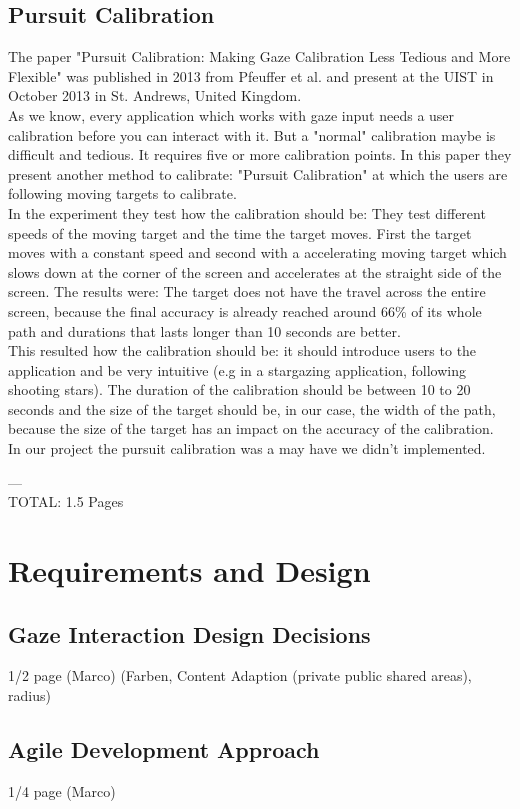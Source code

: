 \documentclass{sigchi}
\begin{document}
\subsection{Pursuit Calibration}
The paper "Pursuit Calibration: Making Gaze Calibration Less Tedious and More Flexible" was published in 2013 from Pfeuffer et al. and present at the UIST in October 2013 in St. Andrews, United Kingdom.\\
As we know, every application which works with gaze input needs a user calibration before you can interact with it. But a "normal" calibration maybe is difficult and tedious. It requires five or more calibration points. In this paper they present another method to calibrate: "Pursuit Calibration" at which the users are following moving targets to calibrate.\\
In the experiment they test how the calibration should be: They test different speeds of the moving target and the time the target moves. First the target moves with a constant speed and second with a accelerating moving target which slows down at the corner of the screen and accelerates at the straight side of the screen. The results were: The target does not have the travel across the entire screen, because the final accuracy is already reached around 66\% of its whole path and durations that lasts longer than 10 seconds are better.\\
This resulted how the calibration should be: it should introduce users to the application and be very intuitive (e.g in a stargazing application, following shooting stars). The duration of the calibration should be between 10 to 20 seconds and the size of the target should be, in our case, the width of the path, because the size of the target has an impact on the accuracy of the calibration.\\
In our project the pursuit calibration was a may have we didn't implemented.

---\\
TOTAL: 1.5 Pages

\section{Requirements and Design}
\subsection{Gaze Interaction Design Decisions}
1/2 page (Marco) (Farben, Content Adaption (private public shared areas), radius)
\subsection{Agile Development Approach}
1/4 page (Marco)
\end{document}
